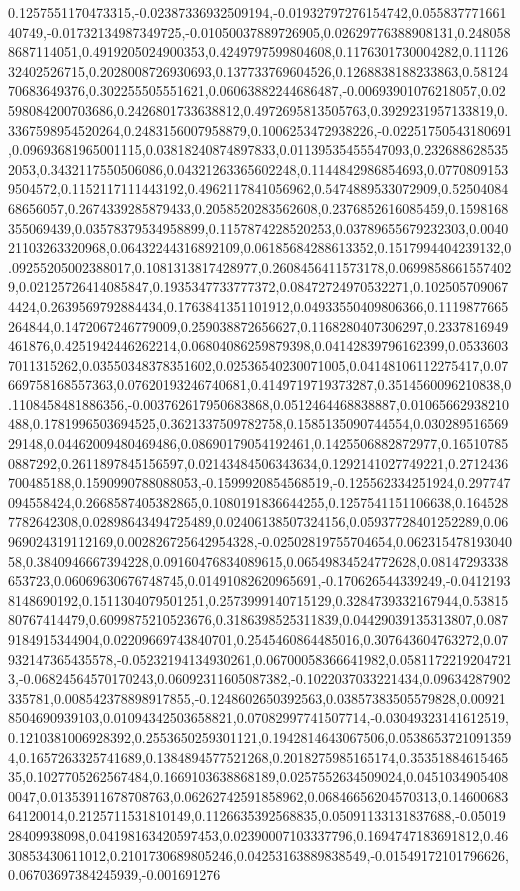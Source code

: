 0.1257551170473315,-0.02387336932509194,-0.01932797276154742,0.05583777166140749,-0.01732134987349725,-0.01050037889726905,0.02629776388908131,0.2480588687114051,0.4919205024900353,0.4249797599804608,0.1176301730004282,0.1112632402526715,0.2028008726930693,0.137733769604526,0.1268838188233863,0.5812470683649376,0.302255505551621,0.06063882244686487,-0.00693901076218057,0.02598084200703686,0.2426801733638812,0.4972695813505763,0.3929231957133819,0.3367598954520264,0.2483156007958879,0.1006253472938226,-0.02251750543180691,0.09693681965001115,0.03818240874897833,0.01139535455547093,0.2326886285352053,0.3432117550506086,0.04321263365602248,0.1144842986854693,0.07708091539504572,0.1152117111443192,0.4962117841056962,0.5474889533072909,0.5250408468656057,0.2674339285879433,0.2058520283562608,0.2376852616085459,0.1598168355069439,0.03578379534958899,0.1157874228520253,0.03789655679232303,0.004021103263320968,0.06432244316892109,0.06185684288613352,0.1517994404239132,0.09255205002388017,0.1081313817428977,0.2608456411573178,0.06998586615574029,0.02125726414085847,0.1935347733777372,0.08472724970532271,0.1025057090674424,0.2639569792884434,0.1763841351101912,0.04933550409806366,0.1119877665264844,0.1472067246779009,0.259038872656627,0.1168280407306297,0.2337816949461876,0.4251942446262214,0.06804086259879398,0.04142839796162399,0.05336037011315262,0.03550348378351602,0.02536540230071005,0.04148106112275417,0.07669758168557363,0.07620193246740681,0.4149719719373287,0.3514560096210838,0.1108458481886356,-0.003762617950683868,0.0512464468838887,0.01065662938210488,0.1781996503694525,0.3621337509782758,0.1585135090744554,0.03028951656929148,0.04462009480469486,0.08690179054192461,0.1425506882872977,0.165107850887292,0.2611897845156597,0.02143484506343634,0.1292141027749221,0.2712436700485188,0.1590990788088053,-0.1599920854568519,-0.125562334251924,0.297747094558424,0.2668587405382865,0.1080191836644255,0.1257541151106638,0.1645287782642308,0.02898643494725489,0.02406138507324156,0.05937728401252289,0.06969024319112169,0.002826725642954328,-0.02502819755704654,0.06231547819304058,0.3840946667394228,0.09160476834089615,0.06549834524772628,0.08147293338653723,0.06069630676748745,0.01491082620965691,-0.170626544339249,-0.04121938148690192,0.1511304079501251,0.2573999140715129,0.3284739332167944,0.5381580767414479,0.6099875210523676,0.3186398525311839,0.04429039135313807,0.0879184915344904,0.02209669743840701,0.2545460864485016,0.307643604763272,0.07932147365435578,-0.05232194134930261,0.06700058366641982,0.05811722192047213,-0.06824564570170243,0.06092311605087382,-0.1022037033221434,0.09634287902335781,0.008542378898917855,-0.1248602650392563,0.03857383505579828,0.009218504690939103,0.01094342503658821,0.07082997741507714,-0.03049323141612519,0.1210381006928392,0.2553650259301121,0.1942814643067506,0.05386537210913594,0.1657263325741689,0.1384894577521268,0.2018275985165174,0.3535188461546535,0.1027705262567484,0.1669103638868189,0.0257552634509024,0.04510349054080047,0.01353911678708763,0.06262742591858962,0.06846656204570313,0.1460068364120014,0.2125711531810149,0.1126635392568835,0.05091133131837688,-0.0501928409938098,0.04198163420597453,0.02390007103337796,0.1694747183691812,0.4630853430611012,0.2101730689805246,0.04253163889838549,-0.01549172101796626,0.06703697384245939,-0.001691276